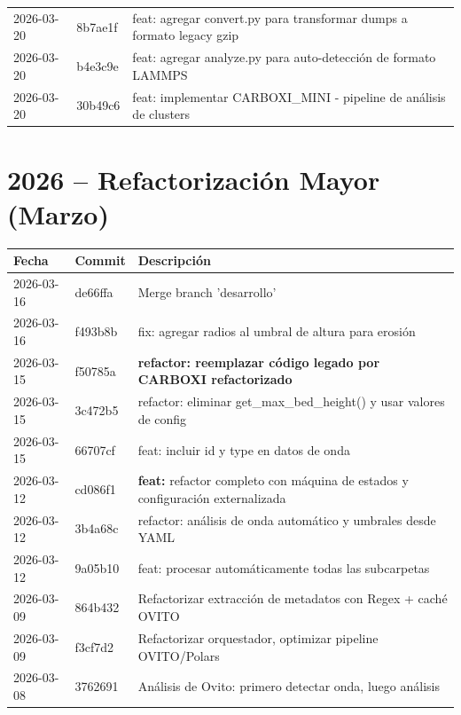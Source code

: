 \documentclass[12pt,a4paper]{article}
\begin{document}
\begin{longtable}{@{}llp{10cm}@{}}
	2026-03-20     & 8b7ae1f         & feat: agregar convert.py para transformar dumps a formato legacy gzip                                                 \\
	2026-03-20     & b4e3c9e         & feat: agregar analyze.py para auto-detección de formato LAMMPS                                                        \\
	2026-03-20     & 30b49c6         & feat: implementar CARBOXI\_MINI - pipeline de análisis de clusters                                                    \\
	\bottomrule
\end{longtable}

\section*{2026 -- Refactorización Mayor (Marzo)}

\begin{longtable}{@{}llp{10cm}@{}}
	\toprule
	\textbf{Fecha} & \textbf{Commit} & \textbf{Descripción}                                                                  \\
	\midrule
	2026-03-16     & de66ffa         & Merge branch 'desarrollo'                                                             \\
	2026-03-16     & f493b8b         & fix: agregar radios al umbral de altura para erosión                                  \\
	2026-03-15     & f50785a         & \textbf{refactor: reemplazar código legado por CARBOXI refactorizado}                 \\
	2026-03-15     & 3c472b5         & refactor: eliminar get\_max\_bed\_height() y usar valores de config                   \\
	2026-03-15     & 66707cf         & feat: incluir id y type en datos de onda                                              \\
	2026-03-12     & cd086f1         & \textbf{feat:} refactor completo con máquina de estados y configuración externalizada \\
	2026-03-12     & 3b4a68c         & refactor: análisis de onda automático y umbrales desde YAML                           \\
	2026-03-12     & 9a05b10         & feat: procesar automáticamente todas las subcarpetas                                  \\
	2026-03-09     & 864b432         & Refactorizar extracción de metadatos con Regex + caché OVITO                          \\
	2026-03-09     & f3cf7d2         & Refactorizar orquestador, optimizar pipeline OVITO/Polars                             \\
	2026-03-08     & 3762691         & Análisis de Ovito: primero detectar onda, luego análisis                              \\
	\bottomrule
\end{longtable}
\end{document}
